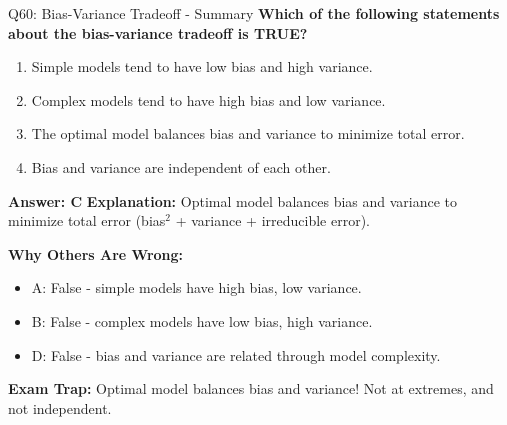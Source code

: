 \documentclass[8pt]{beamer}
\begin{document}
	\begin{frame}{Q60: Bias-Variance Tradeoff - Summary}
		\fontsize{6.5}{7.5}\selectfont
		\textbf{Which of the following statements about the bias-variance tradeoff is TRUE?}
		
		\begin{enumerate}
			\item Simple models tend to have low bias and high variance.
			\item Complex models tend to have high bias and low variance.
			\item The optimal model balances bias and variance to minimize total error.
			\item Bias and variance are independent of each other.
		\end{enumerate}
		
		\vspace{0.05cm}
		\textcolor{myblue}{\textbf{Answer: C}}
		\vspace{0.05cm}
		\textcolor{myblue}{\textbf{Explanation:}} Optimal model balances bias and variance to minimize total error (bias$^2$ + variance + irreducible error).
		
		\vspace{0.05cm}
		\textcolor{myred}{\textbf{Why Others Are Wrong:}}
		\begin{itemize}
			\item \textcolor{myred}{A:} False - simple models have high bias, low variance.
			\item \textcolor{myred}{B:} False - complex models have low bias, high variance.
			\item \textcolor{myred}{D:} False - bias and variance are related through model complexity.
		\end{itemize}
		
		\textcolor{myred}{\textbf{Exam Trap:}} Optimal model \textcolor{myblue}{balances bias and variance}! Not at extremes, and not independent.
	\end{frame}
	
	
\end{document}
